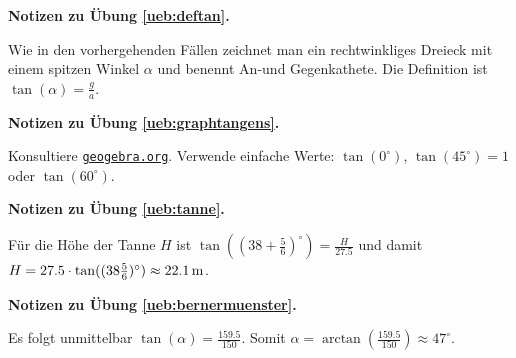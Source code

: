 \documentclass[%
11pt,%
twoside,%
titlepage,%
swissgerman,%
headsepline%
]{scrartcl}
\newcommand{\faReturnGray}{\textcolor{gray}{\faMailReply}} %
\newcommand{\geogebralink}{\href{https://www.geogebra.org/calculator}{\texttt{geogebra.org}}}
\theoremstyle{definition}
\theoremstyle{plain}
\newcommand{\concatueb}[1]{ueb:#1}%
\newcommand{\concatlsg}[1]{lsg:#1}%
\newenvironment{lsg}[1]{%
    \par\noindent\textbf{Notizen zu Übung \ref{\concatueb{#1}}.}%
    \label{\concatlsg{#1}} %
    \hfill\hyperref[\concatueb{#1}]{\faReturnGray}\par %
}{%
    \par%
}
\begin{document}
\begin{lsg}{deftan}
Wie in den vorhergehenden F\"allen zeichnet man ein rechtwinkliges Dreieck mit einem spitzen Winkel $\alpha$ und benennt An-und Gegenkathete. Die Definition ist $\tan(\alpha)=\frac{g}{a}$.
\end{lsg}

\begin{lsg}{graphtangens}
Konsultiere \geogebralink . Verwende einfache Werte: $\tan(0^{\circ})$, $\tan(45^{\circ})=1$ oder $\tan(60^{\circ})$.
\end{lsg}

\begin{lsg}{tanne}
F\"ur die H\"ohe der Tanne $H$ ist $\tan( (38+\frac{5}{6})^\circ)=\frac{H}{27.5}$ und damit $H=27.5\cdot \tan( (38\frac{5}{6})^\circ)\approx\unit[22.1]{m}$.
\end{lsg}

\begin{lsg}{bernermuenster}
Es folgt unmittelbar $\tan(\alpha)=\frac{159.5}{150}$. Somit $\alpha=\arctan(\frac{159.5}{150})\approx47^{\circ}$.
\end{lsg}
\end{document}
